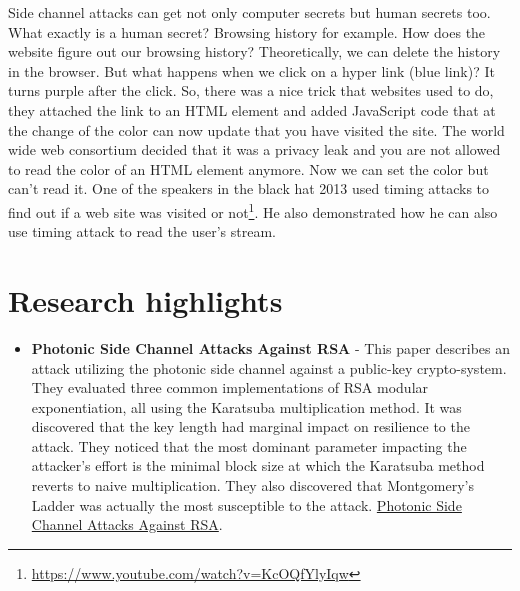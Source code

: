 Side channel attacks can get not only computer secrets but human secrets too.
What exactly is a human secret? Browsing history for example. How does the
website figure out our browsing history? Theoretically, we can delete the
history in the browser. But what happens when we click on a hyper link (blue
link)? It turns purple after the click. So, there was a nice trick that websites
used to do, they attached the link to an HTML element and added JavaScript code
that at the change of the color can now update that you have visited the site.
The world wide web consortium decided that it was a privacy leak and you are not
allowed to read the color of an HTML element anymore. Now we can set the color
but can't read it. One of the speakers in the black hat 2013 used timing attacks
to find out if a web site was visited or
not\footnote{\url{https://www.youtube.com/watch?v=KcOQfYlyIqw}}. He also
demonstrated how he can also use timing attack to read the user's stream. 
\section{Research highlights} \label{sec:RelatedWork}
\begin{itemize}
    \item \textbf{Photonic Side Channel Attacks Against RSA} - This paper describes an attack utilizing the
    photonic side channel against a public-key crypto-system. They
    evaluated three common implementations of RSA modular exponentiation, all using the Karatsuba multiplication method.
    It was discovered that the key length had marginal impact on resilience to the attack.
    They noticed that the most dominant parameter impacting the attacker’s effort is the minimal block size at which the Karatsuba method reverts to naive multiplication.
    They also discovered that Montgomery’s Ladder was actually the most susceptible to the attack.
    \href{https://www.eng.tau.ac.il/~yash/ieee-host-2017.pdf}{Photonic Side Channel Attacks Against RSA}.
\end{itemize}